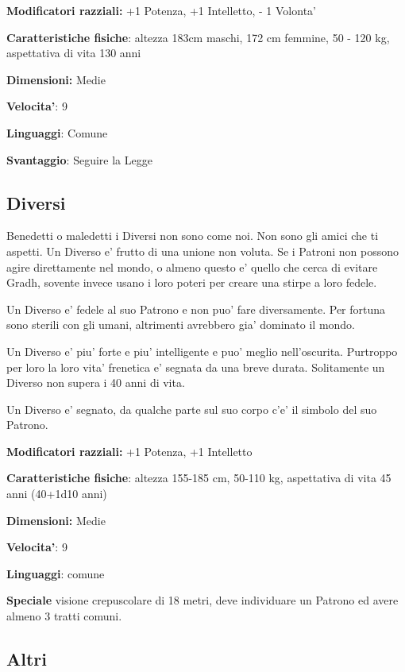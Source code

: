 \documentclass[a4paper,11pt,twoside,openany]{book}
\begin{document}
	\textbf{Modificatori razziali:} +1 Potenza, +1 Intelletto, - 1 Volonta'
	
	\textbf{Caratteristiche fisiche}: altezza 183cm maschi, 172 cm femmine, 50 - 120 kg, aspettativa di vita 130 anni
	
	\textbf{Dimensioni:} Medie
	
	\textbf{Velocita'}: 9
	
	\textbf{Linguaggi}: Comune
	
	\textbf{Svantaggio}: Seguire la Legge
	
	\subsection{Diversi}
	
	\label{diversi}
	
	Benedetti o maledetti i Diversi non sono come noi. Non sono gli amici che ti aspetti. Un Diverso e' frutto di una unione non voluta. Se i Patroni non possono agire direttamente nel mondo, o almeno questo e' quello che cerca di evitare Gradh, sovente invece usano i loro poteri per creare una stirpe a loro fedele.
	
	Un Diverso e' fedele al suo Patrono e non puo' fare diversamente. Per fortuna sono sterili con gli umani, altrimenti avrebbero gia' dominato il mondo.
	
	Un Diverso e' piu' forte e piu' intelligente e puo' meglio nell'oscurita. Purtroppo per loro la loro vita' frenetica e' segnata da una breve durata. Solitamente un Diverso non supera i 40 anni di vita.
	
	Un Diverso e' segnato, da qualche parte sul suo corpo c'e' il simbolo del suo Patrono.
	
	\textbf{Modificatori razziali:} +1 Potenza, +1 Intelletto
	
	\textbf{Caratteristiche fisiche}: altezza 155-185 cm, 50-110 kg, aspettativa di vita 45 anni (40+1d10 anni)
	
	\textbf{Dimensioni:} Medie
	
	\textbf{Velocita'}: 9
	
	\textbf{Linguaggi}: comune
	
	\textbf{Speciale} visione crepuscolare di 18 metri, deve individuare un Patrono ed avere almeno 3 tratti comuni.
	
	\subsection{Altri}
	
\end{document}
